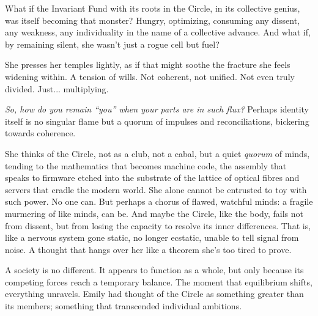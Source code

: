 \smallskip

What if the Invariant Fund with its roots in the Circle, in its collective genius, was itself becoming that monster? Hungry, optimizing, consuming any dissent, any weakness, any individuality in the name of a collective advance. And what if, by remaining silent, she wasn’t just a rogue cell but fuel?

\smallskip

She presses her temples lightly, as if that might soothe the fracture she feels widening within. A tension of wills. Not coherent, not unified. Not even truly divided. Just... multiplying.

\textit{So, how do you remain “you” when your parts are in such flux?} Perhaps identity itself is no singular flame but a quorum of impulses and reconciliations, bickering towards coherence.

\smallskip

She thinks of the Circle, not as a club, not a cabal, but a quiet \textit{quorum} of minds, tending to the mathematics that becomes machine code, the assembly that speaks to firmware etched into the substrate of the lattice of optical fibres and servers that cradle the modern world. She alone cannot be entrusted to toy with such power. No one can. But perhaps a chorus of flawed, watchful minds: a fragile murmering of like minds, can be. And maybe the Circle, like the body, fails not from dissent, but from losing the capacity to resolve its inner differences. That is, like a nervous system gone static, no longer ecstatic, unable to tell signal from noise. A thought that hangs over her like a theorem she’s too tired to prove.

\smallskip


\smallskip

A society is no different. It appears to function as a whole, but only because its competing forces reach a temporary balance. The moment that equilibrium shifts, everything unravels. Emily had thought of the Circle as something greater than its members; something that transcended individual ambitions.

